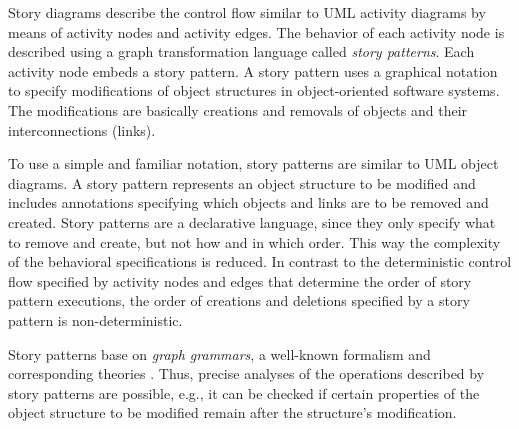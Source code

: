 Story diagrams describe the control flow similar to UML activity diagrams by means of activity nodes and activity edges.
The behavior of each activity node is described using a graph transformation language called \emph{story patterns}.
Each activity node embeds a story pattern.
A story pattern uses a graphical notation to specify modifications of object structures in object-oriented software systems.
The modifications are basically creations and removals of objects and their interconnections (links).


To use a simple and familiar notation, story patterns are similar to UML object diagrams.
A story pattern represents an object structure to be modified and includes annotations specifying which objects and links are to be removed and created.
Story patterns are a declarative language, since they only specify what to remove and create, but not how and in which order.
This way the complexity of the behavioral specifications is reduced.
In contrast to the deterministic control flow specified by activity nodes and edges that determine the order of story pattern executions,
the order of creations and deletions specified by a story pattern is non-deterministic.


Story patterns base on \emph{graph grammars}, a well-known formalism and corresponding theories \cite{Roz97}.
Thus, precise analyses of the operations described by story patterns are possible,
e.g., it can be checked if certain properties of the object structure to be modified remain after the structure's modification.


